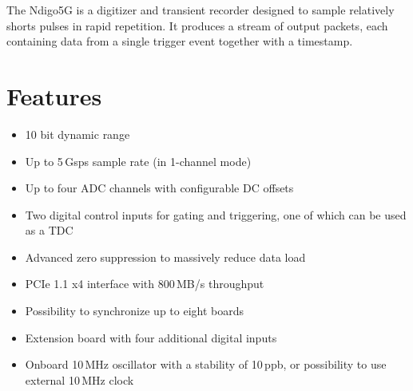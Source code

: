 The Ndigo5G is a digitizer and transient recorder designed to sample relatively shorts pulses in rapid repetition. It produces a stream of output packets, each containing data from a single trigger event together with a timestamp.
\section{Features}
    \begin{itemize}
        \item 10 bit dynamic range
        \item Up to 5\,Gsps sample rate (in 1-channel mode)
        \item Up to four ADC channels with configurable DC offsets
        \item Two digital control inputs for gating and triggering, one of
              which can be used as a TDC
        \item Advanced zero suppression to massively reduce data load
        \item PCIe 1.1 x4 interface with 800\,MB/s throughput
        \item Possibility to synchronize up to eight boards
        \item Extension board with four additional digital inputs
        \item Onboard 10\,MHz oscillator with a stability of 10\,ppb, or
              possibility to use external 10\,MHz clock
    \end{itemize}
